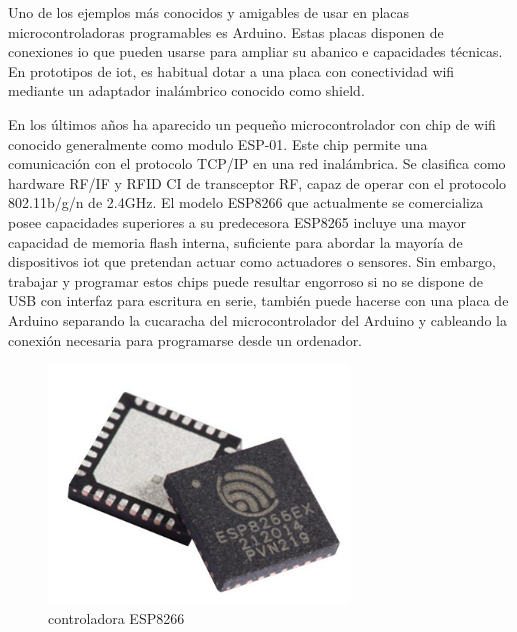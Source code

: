 \vspace{1cm}


Uno de los ejemplos más conocidos y amigables de usar en placas microcontroladoras programables es Arduino. Estas placas disponen de conexiones \gls{io} que pueden usarse para ampliar su abanico e capacidades técnicas. En prototipos de \gls{iot}, es habitual dotar a una placa con conectividad \gls{wifi} mediante un adaptador inalámbrico conocido como shield.

\vspace{1cm}

En los últimos años ha aparecido un pequeño microcontrolador con chip de \gls{wifi} conocido generalmente como modulo ESP-01. Este chip permite una comunicación con el protocolo TCP/IP en una red inalámbrica. Se clasifica como hardware RF/IF y RFID CI de transceptor RF, capaz de operar con el protocolo 802.11b/g/n de 2.4GHz. El modelo ESP8266 que actualmente se comercializa posee capacidades superiores a su predecesora ESP8265 incluye una mayor capacidad de memoria flash interna, suficiente para abordar la mayoría de dispositivos \gls{iot} que pretendan actuar como actuadores o sensores.
Sin embargo, trabajar y programar estos chips puede resultar engorroso si no se dispone de USB con interfaz para escritura en serie, también puede hacerse con una placa de Arduino separando la cucaracha del microcontrolador del Arduino y cableando la conexión necesaria para programarse desde un ordenador.

\begin{figure}[hbt!]
\centering
\includegraphics[height=2.5in]{figures/esp8266ex.jpg}
\caption[controladora ESP8233]{controladora ESP8266\footnotemark}
\end{figure}

\vspace{1cm}

